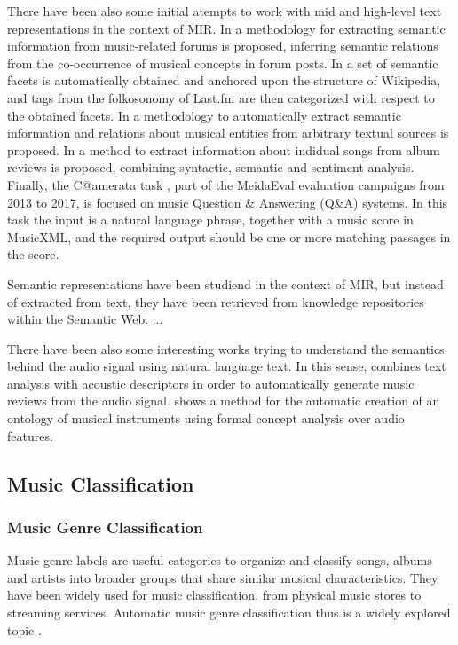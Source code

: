 There have been also some initial atempts to work with mid and high-level text representations in the context of MIR. In \cite{Sordo2012} a methodology for extracting semantic information from music-related forums is proposed, inferring semantic relations from the co-occurrence of musical concepts in forum posts. 
In \cite{Sordo2013} a set of semantic facets is automatically obtained and anchored upon the structure of Wikipedia, and tags from the folkosonomy of Last.fm are then categorized with respect to the obtained facets. 
In \cite{Knees2011} a methodology to automatically extract semantic information and relations about musical entities from arbitrary textual sources is proposed. In \cite{TataandDiEugenio2010} a method to extract information about indidual songs from album reviews is proposed, combining syntactic, semantic and sentiment analysis. Finally, the C@amerata task \cite{sutcliffe2016c, sutcliffe2015}, part of the MeidaEval evaluation campaigns from 2013 to 2017, is focused on music Question \& Answering (Q\&A) systems. In this task the input is a natural language phrase, together with a music score in MusicXML, and the required output should be one or more matching passages in the score.

Semantic representations have been studiend in the context of MIR, but instead of extracted from text, they have been retrieved from knowledge repositories within the Semantic Web. ...

There have been also some interesting works trying to understand the semantics behind the audio signal using natural language text. In this sense, \cite{Whitman2004} combines text analysis with acoustic descriptors in order to automatically generate music reviews from the audio signal. \cite{Kolozali2013} shows a method for the automatic creation of an ontology of musical instruments using formal concept analysis over audio features. 

\subsection{Music Classification}
\label{sec:SOA:mir:classfication}

\subsubsection{Music Genre Classification}

Music genre labels are useful categories to organize and classify songs, albums and artists into broader groups that share similar musical characteristics. They have been widely used for music classification, from physical music stores to streaming services. Automatic music genre classification thus is a widely explored topic \citep{sturm2012survey}.

